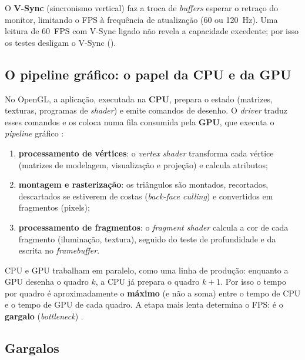 \documentclass[12pt,a4paper]{article}
\newcommand{\code}[1]{\texttt{\detokenize{#1}}}
\begin{document}
O \textbf{V-Sync} (sincronismo vertical) faz a troca de \emph{buffers} esperar o retraço do
monitor, limitando o FPS à frequência de atualização (60 ou 120~Hz). Uma leitura de 60~FPS com
V-Sync ligado não revela a capacidade excedente; por isso os testes desligam o V-Sync
(\code{wglSwapIntervalEXT(0)}).

\subsection{O pipeline gráfico: o papel da CPU e da GPU}

No OpenGL, a aplicação, executada na \textbf{CPU}, prepara o estado (matrizes, texturas,
programas de \emph{shader}) e emite comandos de desenho. O \emph{driver} traduz esses comandos
e os coloca numa fila consumida pela \textbf{GPU}, que executa o \emph{pipeline} gráfico
\cite{akenine,redbook}:
\begin{enumerate}
  \item \textbf{processamento de vértices}: o \emph{vertex shader} transforma cada vértice
        (matrizes de modelagem, visualização e projeção) e calcula atributos;
  \item \textbf{montagem e rasterização}: os triângulos são montados, recortados, descartados
        se estiverem de costas (\emph{back-face culling}) e convertidos em fragmentos (pixels);
  \item \textbf{processamento de fragmentos}: o \emph{fragment shader} calcula a cor de cada
        fragmento (iluminação, textura), seguido do teste de profundidade e da escrita no
        \emph{framebuffer}.
\end{enumerate}
CPU e GPU trabalham em paralelo, como uma linha de produção: enquanto a GPU desenha o quadro
$k$, a CPU já prepara o quadro $k+1$. Por isso o tempo por quadro é aproximadamente o
\textbf{máximo} (e não a soma) entre o tempo de CPU e o tempo de GPU de cada quadro. A etapa
mais lenta determina o FPS: é o \textbf{gargalo} (\emph{bottleneck}) \cite{akenine,nvidiaperf}.

\subsection{Gargalos}
\end{document}
